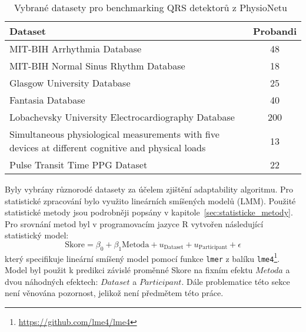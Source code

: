 \begin{table}[h]
    \begin{center}
        \caption{\label{tab:bench_datasets} Vybrané datasety pro benchmarking
            QRS detektorů z PhysioNetu~\cite{PhysioNet}}
        \renewcommand{\arraystretch}{1.3}
        \begin{tabular}{p{12cm}c}
            \toprule
            \textbf{Dataset}                                                                                                 & \textbf{Probandi} \\ \midrule
            MIT-BIH Arrhythmia Database~\cite{MITBIHArrhythmia}                                                              & 48                \\
            MIT-BIH Normal Sinus Rhythm Database~\cite{Beth1990}                                                             & 18                \\
            Glasgow University Database~\cite{GUDB}                                                                          & 25                \\
            Fantasia Database~\cite{FANTASIA}                                                                                & 40                \\
            Lobachevsky University Electrocardiography Database~\cite{LUDB}                                                  & 200               \\
            Simultaneous physiological measurements with five devices at different cognitive and physical loads~\cite{IFADO} & 13                \\
            Pulse Transit Time PPG Dataset~\cite{USYD}                                                                       & 22                \\
            \bottomrule
        \end{tabular}
    \end{center}
\end{table}

Byly vybrány různorodé datasety za účelem zjištění adaptability algoritmu. Pro
statistické zpracování bylo využito lineárních smíšených modelů (\gls{LMM}). Použité
statistické metody jsou podrobněji popsány v kapitole~\ref{sec:statisticke_metody}.
Pro srovnání metod byl v programovacím jazyce R vytvořen následující statistický model:
\begin{equation}
    \text{Skore} = \beta_0 + \beta_1\text{Metoda} + u_{\text{Dataset}} + u_{\text{Participant}} + \epsilon
\end{equation}
který specifikuje lineární smíšený model pomocí funkce \texttt{lmer} z balíku
\texttt{lme4}\footnote{\url{https://github.com/lme4/lme4}}. Model byl použit k
predikci závislé proměnné Skore na fixním efektu $Metoda$ a dvou náhodných
efektech: $Dataset$ a $Participant$. Dále problematice této sekce není věnována
pozornost, jelikož není předmětem této práce. 

